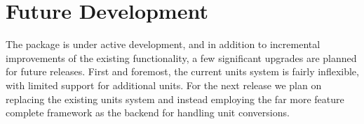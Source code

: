 \section{Future Development}
\label{sec:future}
The  package is under active development, and in addition to incremental improvements of the existing functionality, a few significant upgrades are planned for future releases.  First and foremost, the current  units system is fairly inflexible, with limited support for additional units.  For the next release we plan on replacing the existing units system and instead employing the far more feature complete  framework \citep{Robitailleetal2013} as the backend for handling unit conversions.
